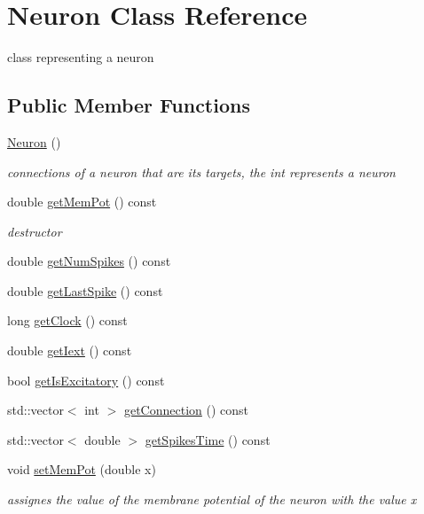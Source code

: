 \hypertarget{classNeuron}{\section{Neuron Class Reference}
\label{classNeuron}
}


class representing a neuron  


\subsection*{Public Member Functions}
\begin{DoxyCompactItemize}
\item 
\hyperlink{classNeuron_a823487d01615fadb8ac19a2768dd9d96}{Neuron} ()
\begin{DoxyCompactList}\small\item\em connections of a neuron that are its targets, the int represents a neuron \end{DoxyCompactList}\item 
double \hyperlink{classNeuron_a3f3be1eace99328ec88c7f14d582d71b}{get\-Mem\-Pot} () const 
\begin{DoxyCompactList}\small\item\em destructor \end{DoxyCompactList}\item 
double \hyperlink{classNeuron_a6360b2084c41ba998269e27620d1b3f8}{get\-Num\-Spikes} () const 
\item 
double \hyperlink{classNeuron_a93930fdb39219c4b79d3badf76ae00f7}{get\-Last\-Spike} () const 
\item 
long \hyperlink{classNeuron_a0998d7e67725ffc3005d42d95fb45962}{get\-Clock} () const 
\item 
double \hyperlink{classNeuron_a8697b23d6eb0c303fdd88e4dd5cec304}{get\-Iext} () const 
\item 
bool \hyperlink{classNeuron_ad4abe820b0cc7815a16509ba88461d26}{get\-Is\-Excitatory} () const 
\item 
std\-::vector$<$ int $>$ \hyperlink{classNeuron_a90de151898abc6bbef1c47f488efaaa0}{get\-Connection} () const 
\item 
std\-::vector$<$ double $>$ \hyperlink{classNeuron_ae85e82fd4b9cc4a15f2403f072968d62}{get\-Spikes\-Time} () const 
\item 
void \hyperlink{classNeuron_a48ce865ca1ae2692a51a81d7255a1079}{set\-Mem\-Pot} (double x)
\begin{DoxyCompactList}\small\item\em assignes the value of the membrane potential of the neuron with the value x \end{DoxyCompactList}\item 

\end{DoxyCompactItemize}
